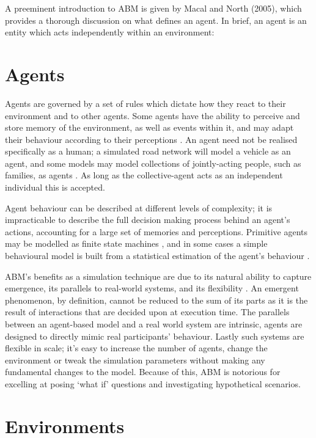 A preeminent introduction to ABM is given by Macal and North (2005), which provides a thorough discussion on what defines an agent. In brief, an agent is an entity which acts independently within an environment:

\section{Agents}
Agents are governed by a set of rules which dictate how they react to their environment and to other agents. Some agents have the ability to perceive and store memory of the environment, as well as events within it, and may adapt their behaviour according to their perceptions \cite{Macal2005TutorialSimulation}. An agent need not be realised specifically as a human; a simulated road network will model a vehicle as an agent, and some models may model collections of jointly-acting people, such as families, as agents \cite{Zhang2009Agent-basedEvacuation}. As long as the collective-agent acts as an independent individual this is accepted.

Agent behaviour can be described at different levels of complexity; it is impracticable to describe the full decision making process behind an agent's actions, accounting for a large set of memories and perceptions. Primitive agents may be modelled as finite state machines \cite{Ren2009Agent-BasedEvacuation}, and in some cases a simple behavioural model is built from a statistical estimation of the agent's behaviour \cite{Dawson2011AnManagement}.

ABM's benefits as a simulation technique are due to its natural ability to capture emergence, its parallels to real-world systems, and its flexibility \cite{Bonabeau2002Agent-basedSystems.}. An emergent phenomenon, by definition, cannot be reduced to the sum of its parts as it is the result of interactions that are decided upon at execution time. The parallels between an agent-based model and a real world system are intrinsic, agents are designed to directly mimic real participants' behaviour. Lastly such systems are flexible in scale; it's easy to increase the number of agents, change the environment or tweak the simulation parameters without making any fundamental changes to the model. Because of this, ABM is notorious for excelling at posing `what if' questions and investigating hypothetical scenarios.

\section{Environments}

